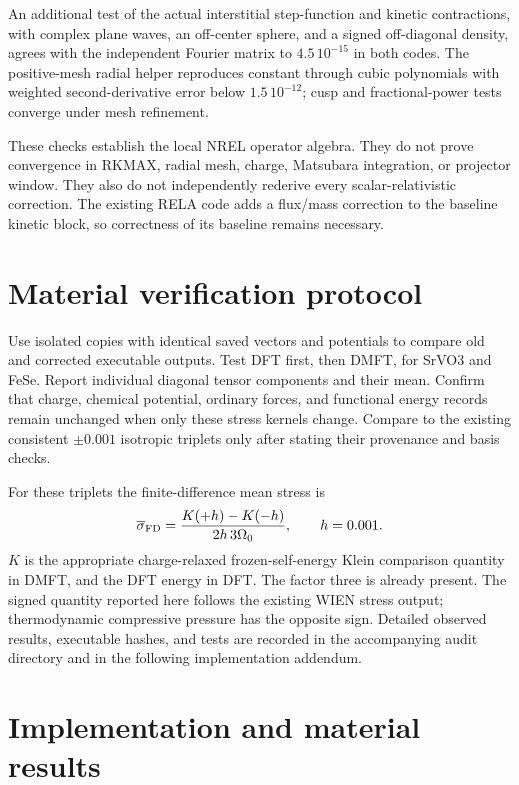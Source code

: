 \documentclass[11pt]{article}
\begin{document}
An additional test of the actual interstitial step-function and kinetic contractions, with complex plane waves, an off-center sphere, and a signed off-diagonal density, agrees with the independent Fourier matrix to $4.5\,10^{-15}$ in both codes. The positive-mesh radial helper reproduces constant through cubic polynomials with weighted second-derivative error below $1.5\,10^{-12}$; cusp and fractional-power tests converge under mesh refinement.

These checks establish the local NREL operator algebra. They do not prove convergence in RKMAX, radial mesh, charge, Matsubara integration, or projector window. They also do not independently rederive every scalar-relativistic correction. The existing RELA code adds a flux/mass correction to the baseline kinetic block, so correctness of its baseline remains necessary.

\section{Material verification protocol}
Use isolated copies with identical saved vectors and potentials to compare old and corrected executable outputs. Test DFT first, then DMFT, for SrVO3 and FeSe. Report individual diagonal tensor components and their mean. Confirm that charge, chemical potential, ordinary forces, and functional energy records remain unchanged when only these stress kernels change. Compare to the existing consistent $\pm0.001$ isotropic triplets only after stating their provenance and basis checks.

For these triplets the finite-difference mean stress is
\begin{equation}
 \overline\sigma_{\rm FD}=\frac{K(+h)-K(-h)}{2h\,3\Omega_0},\qquad h=0.001.
\end{equation}
$K$ is the appropriate charge-relaxed frozen-self-energy Klein comparison quantity in DMFT, and the DFT energy in DFT. The factor three is already present. The signed quantity reported here follows the existing WIEN stress output; thermodynamic compressive pressure has the opposite sign. Detailed observed results, executable hashes, and tests are recorded in the accompanying audit directory and in the following implementation addendum.

\section{Implementation and material results}
\end{document}
